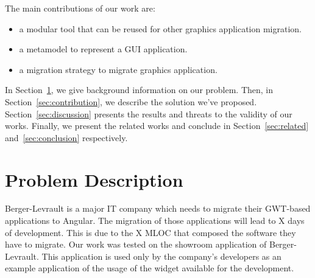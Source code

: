 \documentclass[conference]{IEEEtran}
\begin{document}
    
    The main contributions of our work are:
    \begin{itemize}
    
        \item a modular tool that can be reused for other graphics application migration.
    
        \item a metamodel to represent a GUI application.
    
        \item a migration strategy to migrate graphics application.
        
    \end{itemize}
    
    
    In Section~\ref{sec:problem}, we give background information on our problem. 
    Then, in Section~\ref{sec:contribution}, we describe the solution we've proposed.
    Section~\ref{sec:discussion} presents the results and threats to the validity of our works.
    Finally, we present the related works and conclude in Section~\ref{sec:related} and~\ref{sec:conclusion} respectively.
    
    \section{Problem Description}
    \label{sec:problem}
    
    
    Berger-Levrault is a major IT company which needs to migrate
        their GWT-based applications to Angular.
    The migration of those applications will lead to X days of development.
    This is due to the X MLOC that composed the software they have to migrate.
    Our work was tested on the showroom application of Berger-Levrault. 
    This application is used only by the company's developers as
        an example application of the usage of the widget available for the development.
    
    
    
\end{document}
